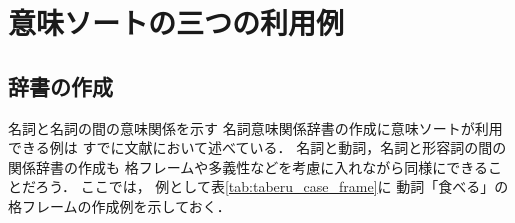 \section{意味ソートの三つの利用例}
\label{sec:riyourei}

\subsection{辞書の作成}

名詞と名詞の間の意味関係を示す
名詞意味関係辞書の作成に意味ソートが利用できる例は
すでに文献\cite{murata_indian_nlp}において述べている．
名詞と動詞，名詞と形容詞の間の関係辞書の作成も
格フレームや多義性などを考慮に入れながら同様にできることだろう．
ここでは，
例として表\ref{tab:taberu_case_frame}に
動詞「食べる」の格フレームの作成例を示しておく．

